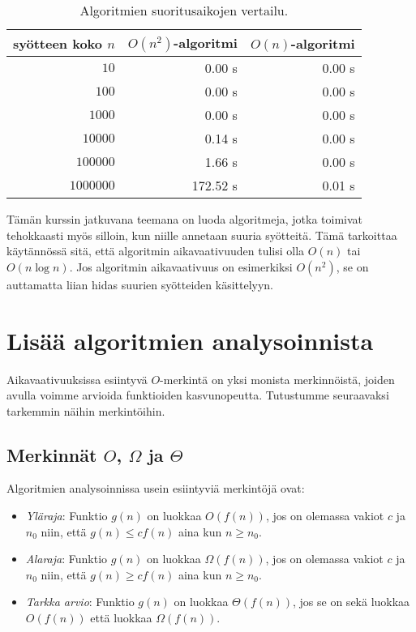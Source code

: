 \begin{table}
\center
\begin{tabular}{rrr}
syötteen koko $n$ & $O(n^2)$-algoritmi & $O(n)$-algoritmi \\
\hline
$10$ & 0.00 s & 0.00 s\\
$100$ & 0.00 s & 0.00 s\\
$1000$ & 0.00 s & 0.00 s\\
$10000$ & 0.14 s & 0.00 s \\
$100000$ & 1.66 s & 0.00 s \\
$1000000$ & 172.52 s & 0.01 s \\
\end{tabular}
\caption{Algoritmien suoritusaikojen vertailu.}
\label{tab:algver}
\end{table}

Tämän kurssin jatkuvana teemana on luoda algoritmeja,
jotka toimivat tehokkaasti myös silloin, kun niille annetaan suuria syötteitä.
Tämä tarkoittaa käytännössä sitä, että algoritmin aikavaativuuden tulisi
olla $O(n)$ tai $O(n \log n)$.
Jos algoritmin aikavaativuus on esimerkiksi $O(n^2)$,
se on auttamatta liian hidas suurien syötteiden käsittelyyn.

\section{Lisää algoritmien analysoinnista}

Aikavaativuuksissa esiintyvä $O$-merkintä on yksi monista merkinnöistä,
joiden avulla voimme arvioida funktioiden kasvunopeutta.
Tutustumme seuraavaksi tarkemmin näihin merkintöihin.

\subsection{Merkinnät $O$, $\Omega$ ja $\Theta$}

Algoritmien analysoinnissa usein esiintyviä merkintöjä ovat:

\begin{itemize}
\item \emph{Yläraja}: Funktio $g(n)$ on luokkaa $O(f(n))$, jos on olemassa vakiot $c$ ja $n_0$
niin, että $g(n) \le c f(n)$ aina kun $n \ge n_0$.
\item \emph{Alaraja}: Funktio $g(n)$ on luokkaa $\Omega(f(n))$, jos on olemassa vakiot $c$ ja $n_0$
niin, että $g(n) \ge c f(n)$ aina kun $n \ge n_0$.
\item \emph{Tarkka arvio}: Funktio $g(n)$ on luokkaa $\Theta(f(n))$, jos se on sekä luokkaa $O(f(n))$
että luokkaa $\Omega(f(n))$.
\end{itemize}

